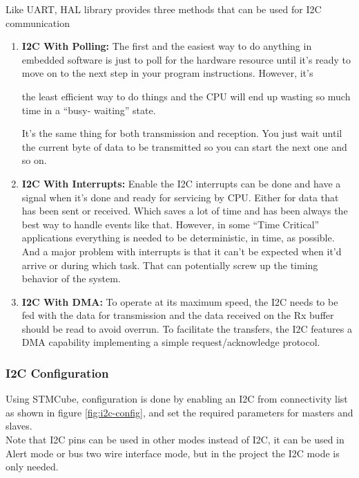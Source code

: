  Like UART, HAL library provides three methods that can be used for I2C communication
 \begin{enumerate}
     \item \textbf{I2C With Polling: }The first and the easiest way to do anything in embedded software is just to poll for the hardware
resource until it’s ready to move on to the next step in your program instructions. However, it’s

the least efficient way to do things and the CPU will end up wasting so much time in a “busy-
waiting” state.

It’s the same thing for both transmission and reception. You just wait until the current byte of data
to be transmitted so you can start the next one and so on.
     \item \textbf{I2C With Interrupts: } Enable the I2C interrupts can be done and have a signal when it’s done and ready for
servicing by CPU. Either for data that has been sent or received. Which saves a lot of time and
has been always the best way to handle events like that.
However, in some “Time Critical” applications everything is needed to be deterministic, in time,
as possible. And a major problem with interrupts is that it can’t be expected when it’d arrive or during
which task. That can potentially screw up the timing behavior of the system.
     \item \textbf{I2C With DMA: }
     To operate at its maximum speed, the I2C needs to be fed with the data for transmission and the
data received on the Rx buffer should be read to avoid overrun. To facilitate the transfers, the I2C
features a DMA capability implementing a simple request/acknowledge protocol.
 \end{enumerate}
 
 \subsubsection{I2C Configuration}
 
 Using STMCube, configuration is done by enabling an I2C from connectivity list as shown in figure \ref{fig:i2c-config}, and set the required parameters for masters and slaves. \\
 Note that I2C pins can be used in other modes instead of I2C, it can be used in Alert mode or bus two wire interface mode, but in the project the I2C mode is only needed.
 \newpage
 
